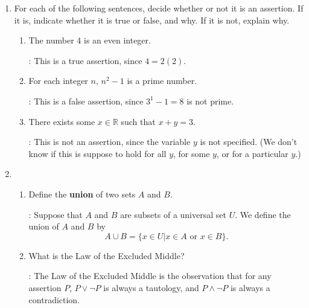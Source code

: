 \documentclass[12pt]{article}
\newcommand{\points}[1]{\marginpar{\hspace{24pt}[#1]}}
\newcommand{\R}{\mathbb{R}}
\begin{document}
\begin{enumerate}
\item For each of the following sentences, decide whether or not it is an assertion. If it is, indicate whether it is true or false, and why. If it is not, explain why.
\begin{enumerate}
\item The number 4 is an even integer. \points{2}


\bigskip

: This is a true assertion, since $4=2(2)$.

\bigskip


\item For each integer $n$, $n^2-1$ is a prime number.\points{2}


\bigskip

: This is a false assertion, since $3^1-1=8$ is not prime.

\bigskip


\item There exists some $x\in\R$ such that $x+y=3$. \points{2}


\bigskip

: This is not an assertion, since the variable $y$ is not specified. (We don't know if this is suppose to hold for all $y$, for some $y$, or for a particular $y$.)

\bigskip

\end{enumerate}

\item 
\begin{enumerate}
\item Define the {\bf union} of two sets $A$ and $B$.\points{2}


\bigskip

: Suppose that $A$ and $B$ are subsets of a universal set $U$. We define the union of $A$ and $B$ by
\[
 A\cup B = \{x\in U | x\in A \text{ or } x\in B\}.
\]


\bigskip


\item What is the Law of the Excluded Middle?\points{2}

\bigskip

: The Law of the Excluded Middle is the observation that for any assertion $P$, $P\vee \neg P$ is always a tautology, and $P\wedge \neg P$ is always a contradiction.

\bigskip


\end{enumerate}
\end{enumerate}
\end{document}
